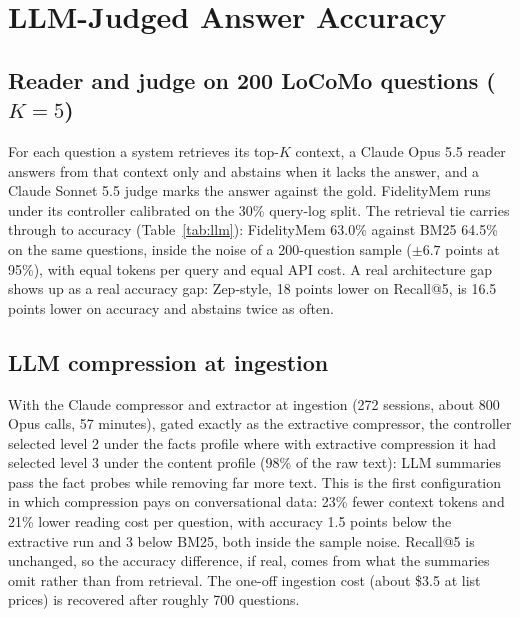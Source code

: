 \documentclass[journal]{IEEEtran}
\begin{document}
\section{LLM-Judged Answer Accuracy}
\subsection{Reader and judge on 200 LoCoMo questions ($K=5$)}
For each question a system retrieves its top-$K$ context, a Claude Opus 5.5 reader answers from that context only and abstains when it lacks the answer, and a Claude Sonnet 5.5 judge marks the answer against the gold. FidelityMem runs under its controller calibrated on the 30\% query-log split. The retrieval tie carries through to accuracy (Table~\ref{tab:llm}): FidelityMem 63.0\% against BM25 64.5\% on the same questions, inside the noise of a 200-question sample ($\pm 6.7$ points at 95\%), with equal tokens per query and equal API cost. A real architecture gap shows up as a real accuracy gap: Zep-style, 18 points lower on Recall@5, is 16.5 points lower on accuracy and abstains twice as often.

\begin{table}[t]
\caption{Answer accuracy, 200 LoCoMo session questions, $K=5$, seed 0. Categories: single-hop / multi-hop / temporal / open-domain / adversarial}
\label{tab:llm}
\centering
\scriptsize
{}
\end{table}

\subsection{LLM compression at ingestion}
With the Claude compressor and extractor at ingestion (272 sessions, about 800 Opus calls, 57 minutes), gated exactly as the extractive compressor, the controller selected level 2 under the facts profile where with extractive compression it had selected level 3 under the content profile (98\% of the raw text): LLM summaries pass the fact probes while removing far more text. This is the first configuration in which compression pays on conversational data: 23\% fewer context tokens and 21\% lower reading cost per question, with accuracy 1.5 points below the extractive run and 3 below BM25, both inside the sample noise. Recall@5 is unchanged, so the accuracy difference, if real, comes from what the summaries omit rather than from retrieval. The one-off ingestion cost (about \$3.5 at list prices) is recovered after roughly 700 questions.
\end{document}

